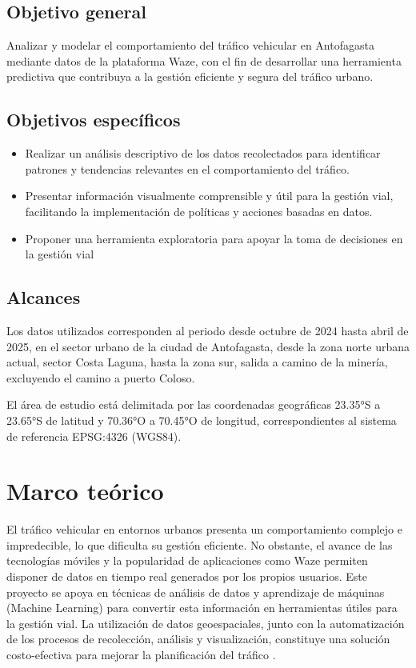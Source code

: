 \documentclass[12pt]{article}
\begin{document}
\subsection{Objetivo general}

Analizar y modelar el comportamiento del tráfico vehicular en Antofagasta mediante datos de la plataforma Waze, con el fin de desarrollar una herramienta predictiva que contribuya a la gestión eficiente y segura del tráfico urbano.

\subsection{Objetivos específicos}

\begin{itemize}
    \item Realizar un análisis descriptivo de los datos recolectados para identificar patrones y tendencias relevantes en el comportamiento del tráfico.
    \item Presentar información visualmente comprensible y útil para la gestión vial, facilitando la implementación de políticas y acciones basadas en datos.
    \item Proponer una herramienta exploratoria para apoyar la toma de decisiones en la gestión vial
\end{itemize}

\subsection{Alcances}

Los datos utilizados corresponden al periodo desde octubre de 2024 hasta abril de 2025, en el sector urbano de la ciudad de Antofagasta, desde la zona norte urbana actual, sector Costa Laguna, hasta la zona sur, salida a camino de la minería, excluyendo el camino a puerto Coloso.

El área de estudio está delimitada por las coordenadas geográficas 23.35°S a 23.65°S de latitud y 70.36°O a 70.45°O de longitud, correspondientes al sistema de referencia EPSG:4326 (WGS84).

\section{Marco teórico}

El tráfico vehicular en entornos urbanos presenta un comportamiento complejo e impredecible, lo que dificulta su gestión eficiente. No obstante, el avance de las tecnologías móviles y la popularidad de aplicaciones como Waze permiten disponer de datos en tiempo real generados por los propios usuarios. Este proyecto se apoya en técnicas de análisis de datos y aprendizaje de máquinas (Machine Learning) para convertir esta información en herramientas útiles para la gestión vial. La utilización de datos geoespaciales, junto con la automatización de los procesos de recolección, análisis y visualización, constituye una solución costo-efectiva para mejorar la planificación del tráfico \parencite{barcelo2005}.
\end{document}
